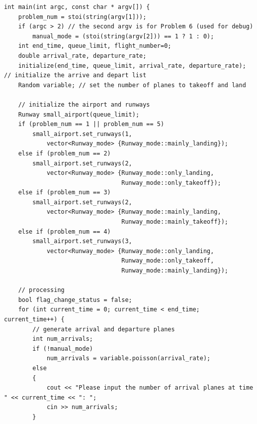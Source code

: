 \documentclass[12pt,UTF8]{ctexart}
\begin{document}
\begin{lstlisting}
int main(int argc, const char * argv[]) {
    problem_num = stoi(string(argv[1]));
    if (argc > 2) // the second argv is for Problem 6 (used for debug)
        manual_mode = (stoi(string(argv[2])) == 1 ? 1 : 0);
    int end_time, queue_limit, flight_number=0;
    double arrival_rate, departure_rate;
    initialize(end_time, queue_limit, arrival_rate, departure_rate); // initialize the arrive and depart list
    Random variable; // set the number of planes to takeoff and land

    // initialize the airport and runways
    Runway small_airport(queue_limit);
    if (problem_num == 1 || problem_num == 5)
        small_airport.set_runways(1,
            vector<Runway_mode> {Runway_mode::mainly_landing});
    else if (problem_num == 2)
        small_airport.set_runways(2,
            vector<Runway_mode> {Runway_mode::only_landing,
                                 Runway_mode::only_takeoff});
    else if (problem_num == 3)
        small_airport.set_runways(2,
            vector<Runway_mode> {Runway_mode::mainly_landing,
                                 Runway_mode::mainly_takeoff});
    else if (problem_num == 4)
        small_airport.set_runways(3,
            vector<Runway_mode> {Runway_mode::only_landing,
                                 Runway_mode::only_takeoff,
                                 Runway_mode::mainly_landing});

    // processing
    bool flag_change_status = false;
    for (int current_time = 0; current_time < end_time; current_time++) {
        // generate arrival and departure planes
        int num_arrivals;
        if (!manual_mode)
            num_arrivals = variable.poisson(arrival_rate);
        else
        {
            cout << "Please input the number of arrival planes at time " << current_time << ": ";
            cin >> num_arrivals;
        }


\end{lstlisting}
\end{document}
